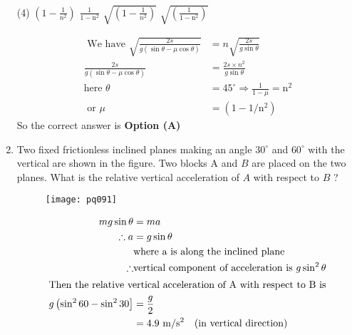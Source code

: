 \begin{enumerate}[label=\color{ocre}\textbf{\arabic*.}]
	\begin{tasks}(4)
		\task[\textbf{A.}]$\left(1-\frac{1}{n^{2}}\right)$
		\task[\textbf{B.}] $\frac{1}{1-\mathrm{n}^{2}}$
		\task[\textbf{C.}] $\sqrt{\left(1-\frac{1}{n^{2}}\right)}$
		\task[\textbf{D.}] $\sqrt{\left(\frac{1}{1-\mathrm{n}^{2}}\right)}$
	\end{tasks}
	\begin{answer}
		\begin{align*}
		\text{	We have }\sqrt{\frac{2 s}{g(\sin \theta-\mu \cos \theta)}}&=n \sqrt{\frac{2 s}{g \sin \theta}}\\
		\frac{2 s}{g(\sin \theta-\mu \cos \theta)}&=\frac{2 s \times n^{2}}{g \sin \theta}\\
		\text{here }\theta&=45^{\circ} \Rightarrow \frac{1}{1-\mu}=\mathrm{n}^{2}\\ \text{ or } \mu&=\left(1-1 / \mathrm{n}^{2}\right)
		\end{align*}
		So the correct answer is \textbf{Option (A)}
	\end{answer}
	\item Two fixed frictionless inclined planes making an angle $30^{\circ}$ and $60^{\circ}$ with the vertical are shown in the figure. Two blocks A and $B$ are placed on the two planes. What is the relative vertical acceleration of $A$ with respect to $B$ ?
	\begin{figure}[H]
		\centering
		\texttt{[image: pq091]}
	\end{figure}
	
	\begin{answer}
		\begin{align*}
		m g \sin \theta&=m a\\
		\therefore a&=g \sin \theta\\
		&\text{where a is along the inclined plane}\\
		\therefore&\text{vertical component of acceleration is $g \sin ^{2} \theta$}\\
		\intertext{Then the  relative vertical acceleration of $\mathrm{A}$ with respect to $\mathrm{B}$ is}
		g\left(\sin ^{2} 60-\sin ^{2} 30\right]&=\frac{g}{2}\\&=4.9 \mathrm{~m} / \mathrm{s}^{2}\quad
		(\text{in vertical direction})
		\end{align*}
	\end{answer}
\end{enumerate}
